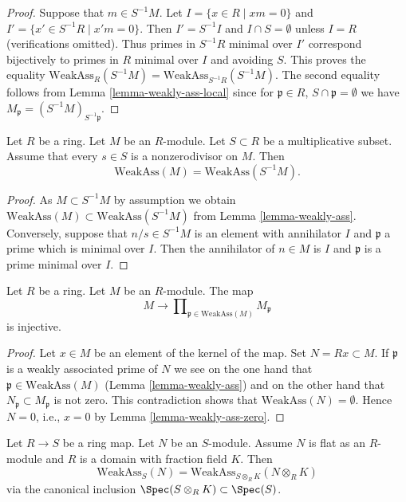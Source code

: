 \begin{proof}
Suppose that $m \in S^{-1}M$. Let $I = \{x \in R \mid xm = 0\}$
and $I' = \{x' \in S^{-1}R \mid x'm = 0\}$. Then $I' = S^{-1}I$
and $I \cap S = \emptyset$ unless $I = R$ (verifications omitted).
Thus primes in $S^{-1}R$ minimal over $I'$ correspond bijectively
to primes in $R$ minimal over $I$ and avoiding $S$. This proves the
equality $\text{WeakAss}_R(S^{-1}M) = \text{WeakAss}_{S^{-1}R}(S^{-1}M)$.
The second equality follows from
Lemma \ref{lemma-weakly-ass-local}
since for $\mathfrak p \in R$, $S \cap \mathfrak p = \emptyset$ we have
$M_{\mathfrak p} = (S^{-1}M)_{S^{-1}\mathfrak p}$.
\end{proof}

\begin{lemma}
\label{lemma-localize-weakly-ass-nonzero-divisors}
Let $R$ be a ring. Let $M$ be an $R$-module.
Let $S \subset R$ be a multiplicative subset.
Assume that every $s \in S$ is a nonzerodivisor on $M$.
Then
$$
\text{WeakAss}(M) = \text{WeakAss}(S^{-1}M).
$$
\end{lemma}

\begin{proof}
As $M \subset S^{-1}M$ by assumption we obtain
$\text{WeakAss}(M) \subset \text{WeakAss}(S^{-1}M)$ from
Lemma \ref{lemma-weakly-ass}.
Conversely, suppose that $n/s \in S^{-1}M$ is an element with annihilator
$I$ and $\mathfrak p$ a prime which is minimal over $I$.
Then the annihilator of $n \in M$ is $I$ and $\mathfrak p$ is a prime
minimal over $I$.
\end{proof}

\begin{lemma}
\label{lemma-zero-at-weakly-ass-zero}
Let $R$ be a ring. Let $M$ be an $R$-module. The map
$$
M
\longrightarrow
\prod\nolimits_{\mathfrak p \in \text{WeakAss}(M)} M_{\mathfrak p}
$$
is injective.
\end{lemma}

\begin{proof}
Let $x \in M$ be an element of the kernel of the map. Set
$N = Rx \subset M$. If $\mathfrak p$ is a weakly associated prime of $N$
we see on the one hand that $\mathfrak p \in \text{WeakAss}(M)$
(Lemma \ref{lemma-weakly-ass})
and on the other hand that $N_{\mathfrak p} \subset M_{\mathfrak p}$
is not zero. This contradiction shows that $\text{WeakAss}(N) = \emptyset$.
Hence $N = 0$, i.e., $x = 0$ by
Lemma \ref{lemma-weakly-ass-zero}.
\end{proof}

\begin{lemma}
\label{lemma-weak-post-bourbaki}
Let $R \to S$ be a ring map.
Let $N$ be an $S$-module.
Assume $N$ is flat as an $R$-module and
$R$ is a domain with fraction field $K$.
Then
$$
\text{WeakAss}_S(N) = \text{WeakAss}_{S \otimes_R K}(N \otimes_R K)
$$
via the canonical inclusion
$\Spec(S \otimes_R K) \subset \Spec(S)$.
\end{lemma}

